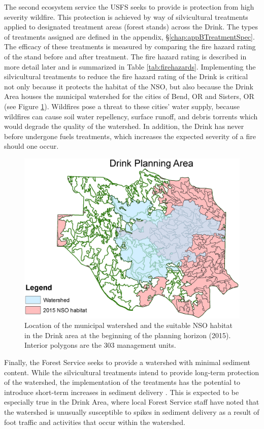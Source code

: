 The second ecosystem service the USFS seeks to provide is protection from high severity wildfire. This protection is achieved by way of silvicultural treatments applied to designated treatment areas (forest stands) across the Drink. The types of treatments assigned are defined in the appendix, \S \ref{chap:appBTreatmentSpec}. The efficacy of these treatments is measured by comparing the fire hazard rating of the stand before and after treatment. The fire hazard rating is described in more detail later and is summarized in Table \ref{tab:firehazards}. Implementing the silvicultural treatments to reduce the fire hazard rating of the Drink is critical not only because it protects the habitat of the NSO, but also because the Drink Area houses the municipal watershed for the cities of Bend, OR and Sisters, OR (see Figure \ref{fig:drinkOwlAndWatershed}). Wildfires pose a threat to these cities' water supply, because wildfires can cause soil water repellency, surface runoff, and debris torrents \cite{ice2004effects} which would degrade the quality of the watershed. In addition, the Drink has never before undergone fuels treatments, which increases the expected severity of a fire should one occur. 
\begin{figure}
\centering
\includegraphics[width=.5\textwidth]{../images/DrinkMap_NSOAndWatershed}
\caption[NSO Habitat and municipal watershed in the Drink Planning Area]{Location of the municipal watershed and the suitable NSO habitat in the Drink area at the beginning of the planning horizon (2015). Interior polygons are the 303 management units.}
\label{fig:drinkOwlAndWatershed}
\end{figure}

Finally, the Forest Service seeks to provide a watershed with minimal sediment content. While the silvicultural treatments intend to provide long-term protection of the watershed, the implementation of the treatments has the potential to introduce short-term increases in sediment delivery \cite{o2005conceptual}. This is expected to be especially true in the Drink Area, where local Forest Service staff have noted that the watershed is unusually susceptible to spikes in sediment delivery as a result of foot traffic and activities that occur within the watershed.

